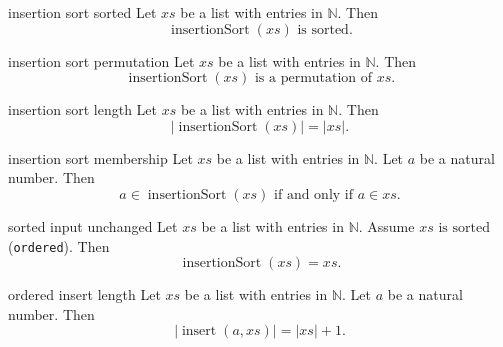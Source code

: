 \begin{cleanresult}{insertion sort sorted}
Let $\mathit{xs}$ be a list with entries in $\mathbb{N}$.
Then \[\operatorname{insertionSort}(\mathit{xs})\text{ is sorted}.\]
\end{cleanresult}

\begin{cleanresult}{insertion sort permutation}
Let $\mathit{xs}$ be a list with entries in $\mathbb{N}$.
Then \[\operatorname{insertionSort}(\mathit{xs})\text{ is a permutation of }\mathit{xs}.\]
\end{cleanresult}

\begin{cleanresult}{insertion sort length}
Let $\mathit{xs}$ be a list with entries in $\mathbb{N}$.
Then \[\lvert \operatorname{insertionSort}(\mathit{xs})\rvert=\lvert \mathit{xs}\rvert.\]
\end{cleanresult}

\begin{cleanresult}{insertion sort membership}
Let $\mathit{xs}$ be a list with entries in $\mathbb{N}$.
Let $a$ be a natural number.
Then \[a\in \operatorname{insertionSort}(\mathit{xs})\text{ if and only if }a\in \mathit{xs}.\]
\end{cleanresult}

\begin{cleanresult}{sorted input unchanged}
Let $\mathit{xs}$ be a list with entries in $\mathbb{N}$.
Assume $\mathit{xs}\text{ is sorted}$ (\texttt{ordered}).
Then \[\operatorname{insertionSort}(\mathit{xs})=\mathit{xs}.\]
\end{cleanresult}

\begin{cleanresult}{ordered insert length}
Let $\mathit{xs}$ be a list with entries in $\mathbb{N}$.
Let $a$ be a natural number.
Then \[\lvert \operatorname{insert}(a,\mathit{xs})\rvert=\lvert \mathit{xs}\rvert+1.\]
\end{cleanresult}

